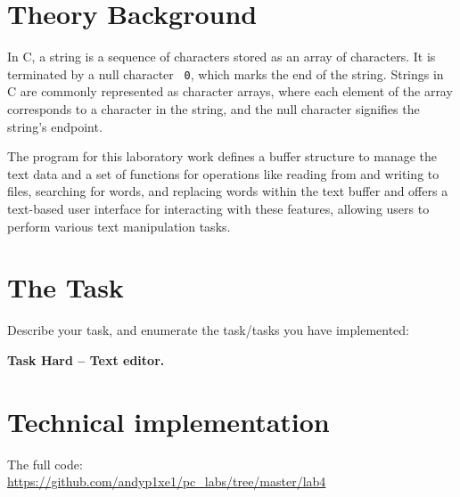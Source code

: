 \documentclass[12pt]{article}
\begin{document}
\setcounter{page}{2}
\pagestyle{fancy}
\fancyhf{}
\rhead{\thepage}

\section*{Theory Background}
In C, a string is a sequence of characters stored as an array of characters. It is terminated by a null character \texttt{\ 0}, which marks the end of the string. Strings in C are commonly represented as character arrays, where each element of the array corresponds to a character in the string, and the null character signifies the string's endpoint.

The program for this laboratory work defines a buffer structure to manage the text data and a set of functions for operations like reading from and writing to files, searching for words, and replacing words within the text buffer and offers a text-based user interface for interacting with these features, allowing users to perform various text manipulation tasks.

\section*{The Task}

Describe your task, and enumerate the task/tasks you have implemented:

\textbf{Task Hard -- Text editor.}

\section*{Technical implementation}
The full code:\\
\url{https://github.com/andyp1xe1/pc_labs/tree/master/lab4}
\end{document}
